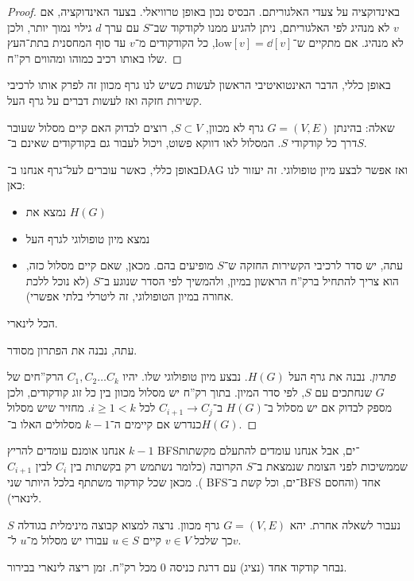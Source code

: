 \documentclass[]{../../../../tex/classes/styledArticle}
\newcommand\low{\mathrm{low}}
\begin{document}
	\begin{proof}
		באינדוקציה על צעדי האלגוריתם. הבסיס נכון באופן טרוויאלי. בצעד האינדוקציה, אם $v$ לא מנהיג לפי האלגוריתם, ניתן להגיע ממנו לקודקוד שב־$S$ עם ערך $d$ גילוי נמוך יותר, ולכן לא מנהיג. אם מתקיים ש־$\low[v] = \dd[v]$, כל הקודקודים מ־$v$ עד סוף המחסנית בתת־העץ שלו באותו רכיב כמוהו ומהווים רק''ח. 
	\end{proof}
	
	
	באופן כללי, הדבר האינטואיטיבי הראשון לעשות כשיש לנו גרף מכוון זה לפרק אותו לרכיבי קשירות חזקה ואז לעשות דברים על גרף העל. 
	
	שאלה: בהינתן $G = (V, E)$ גרף לא מכוון, $S \subset V$, רוצים לבדוק האם קיים מסלול שעובר דרך כל קודקודי $S$. המסלול לאו דווקא פשוט, ויכול לעבור גם בקודקודים שאינם ב־$S$. 
	
	באופן כללי, כאשר עוברים לעל־גרף אנחנו ב־DAG ואז אפשר לבצע מיון טופולוגי. זה יעזור לנו כאן: 
	\begin{itemize}
		\item נמצא את $H(G)$
		\item נמצא מיון טופולוגי לגרף העל
		\item עתה, יש סדר לרכיבי הקשירות החזקה ש־$S$ מופיעים בהם. מכאן, שאם קיים מסלול כזה, הוא צריך להתחיל ברק''ח הראשון במיון, ולהמשיך לפי הסדר שנוגע ב־$S$ (לא נוכל ללכת אחורה במיון הטופולוגי, זה ליטרלי בלתי אפשרי). 
	\end{itemize}
	הכל לינארי. 
	
	עתה, נבנה את הפתרון מסודר. 
	\begin{proof}[פתרון]
		נבנה את גרף העל $H(G)$. נבצע מיון טופולוגי שלו. יהיו $C_1, C_2 \dots C_k$ הרק''חים של $G$ שנחתכים עם $S$, לפי סדר המיון. בתוך רק''ח יש מסלול מכוון בין כל זוג קודקודים, ולכן מספק לבדוק אם יש מסלול ב־$H(G)$ ב־$C_{i + 1} \to C_j$ לכל $i \ge 1 < k$. מחזיר שיש מסלול כנדרש אם קיימים ה־$k - 1$ מסלולים האלו ב־$H(G)$. 
	\end{proof}
	
	אנחנו אומנם עומדים להריץ $k - 1$ BFS־ים, אבל אנחנו עומדים להתעלם מקשתות שממשיכות לפני הצומת שנמצאת ב־$S$ הקרובה (כלומר נשתמש רק בקשתות בין $C_i$ לבין $C_{i + 1}$). מכאן שכל קודקוד משתתף בלכל היותר שני BFS־ים, וכל קשת ב־BFS אחד (והחסם לינארי). 
	
	
	נעבור לשאלה אחרת. יהא $G = (V, E)$ גרף מכוון. נרצה למצוא קבוצה מינימלית בגודלה $S$ כך שלכל $v \in V$ קיים $u \in S$ עבורו יש מסלול מ־$u$ ל־$v$. 
	
	נבחר קודקוד אחד (נציג) עם דרגת כניסה $0$ מכל רק''ח. זמן ריצה לינארי בבירור. 
	
\end{document}
